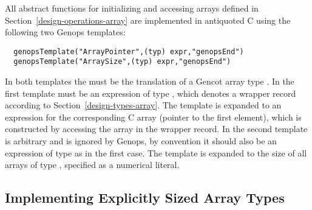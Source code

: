 All abstract functions for initializing and accessing arrays defined in Section~\ref{design-operations-array} are implemented
in antiquoted C using the following two Genops templates:
\begin{verbatim}
  genopsTemplate("ArrayPointer",(typ) expr,"genopsEnd")
  genopsTemplate("ArraySize",(typ) expr,"genopsEnd")
\end{verbatim}
In both templates the  must be the translation of a Gencot array type . In the first template 
must be an expression of type , which denotes a wrapper record according to Section~\ref{design-types-array}.
The template is expanded to an expression for the corresponding C array (pointer to the first element), which is constructed by 
accessing the array in the wrapper record. In the second template  is arbitrary and is ignored by Genops, by convention it 
should also be an expression of type  as in the first case. The template is expanded to the size of all arrays of type 
, specified as a numerical literal.

\subsection{Implementing Explicitly Sized Array Types}
\label{impl-operations-esarray}

